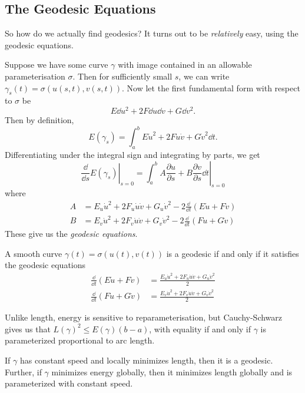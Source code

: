 \documentclass[a4paper]{article}
\begin{document}
\subsection{The Geodesic Equations}

So how do we actually find geodesics? It turns out to be \emph{relatively} easy, using the geodesic equations.

Suppose we have some curve $\gamma$ with image contained in an allowable parameterisation $\sigma$. Then for sufficiently small $s$, we can write $\gamma_s(t) = \sigma(u(s, t), v(s, t))$. 
Now let the first fundamental form with respect to $\sigma$ be
$$
E \dd u ^2 + 2F \dd u \dd v + G \dd v^2.
$$
Then by definition,
$$
E(\gamma_s) = \int_a^b E \dot{u}^2 + 2F \dot{u} \dot{v} + G \dot{v}^2 \dd t.
$$
Differentiating under the integral sign and integrating by parts, we get
$$
\left.\frac{\dd}{\dd s} E(\gamma_s) \right|_{s = 0} = \left.\int_a^b A \frac{\partial u}{\partial s} + B \frac{\partial v}{\partial s} \dd t \right|_{s = 0}
$$
where
\begin{align*}
    A &= E_u \dot{u}^2 + 2F_u \dot{u} \dot{v} + G_u \dot{v}^2 - 2 \frac{\dd}{\dd t} (E \dot{u} + F \dot{v}) \\
    B &= E_v \dot{u}^2 + 2F_v \dot{u} \dot{v} + G_v \dot{v}^2 - 2 \frac{\dd}{\dd t}(F \dot{u} + G\dot{v})
\end{align*}
These give us the \emph{geodesic equations}.

\begin{theorem}
    A smooth curve $\gamma(t) = \sigma(u(t), v(t))$ is a geodesic if and only if it satisfies the geodesic equations
    \begin{align*}
        \frac{\dd}{\dd t} (E \dot{u} + F \dot{v}) &= \frac{
        E_u \dot{u}^2 + 2F_u \dot{u} \dot{v} + G_u \dot{v}^2}{2} \\
        \frac{\dd}{\dd t}(F \dot{u} + G\dot{v})  &= \frac{E_v \dot{u}^2 + 2F_v \dot{u} \dot{v} + G_v \dot{v}^2}{2}
    \end{align*}
\end{theorem}

Unlike length, energy is sensitive to reparameterisation, but Cauchy-Schwarz gives us that $L(\gamma)^2 \leq E(\gamma) (b - a)$, with equality if and only if $\gamma$ is parameterized proportional to arc length.

\begin{corollary}
    If $\gamma$ has constant speed and locally minimizes length, then it is a geodesic. Further, if $\gamma$ minimizes energy globally, then it minimizes length globally and is parameterized with constant speed.
\end{corollary}
\end{document}
